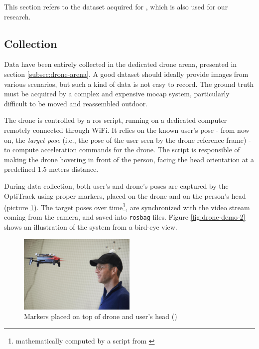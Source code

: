 This section refers to the dataset acquired for \cite{mantegazza2019visionbased}, which is also used for our research.


\subsection{Collection}
\label{subsec:control}

Data have been entirely collected in the dedicated drone arena, presented in section \ref{subsec:drone-arena}. A good dataset should ideally provide images from various scenarios, but such a kind of data is not easy to record. The ground truth must be acquired by a complex and expensive \gls{mocap} system, particularly difficult to be moved and reassembled outdoor.

\medskip

The drone is controlled by a \gls{ros} script, running on a dedicated computer remotely connected through WiFi. It relies on the known user's pose - from now on, the \textit{target pose} (i.e., the pose of the user seen by the drone reference frame) - to compute acceleration commands for the drone. The script is responsible of making the drone hovering in front of the person, facing the head orientation at a predefined 1.5 meters distance.

During data collection, both user's and drone's poses are captured by the OptiTrack using proper markers, placed on the drone and on the person's head (picture \ref{fig:drone-facing}). The target poses over time\footnote{mathematically computed by a script from \cite{mantegazza2018thesis}}, are synchronized with the video stream coming from the camera, and saved into \texttt{rosbag} files. Figure \ref{fig:drone-demo-2} shows an illustration of the system from a bird-eye view.

\begin{figure}[!h]
	\centering
	\includegraphics[width=0.5\textwidth]{"contents/images/03-drone-facing"}
	\caption[Markers placed on top of drone and user's head]{Markers placed on top of drone and user's head (\cite{mantegazza2018thesis})}
	\label{fig:drone-facing}
\end{figure}

